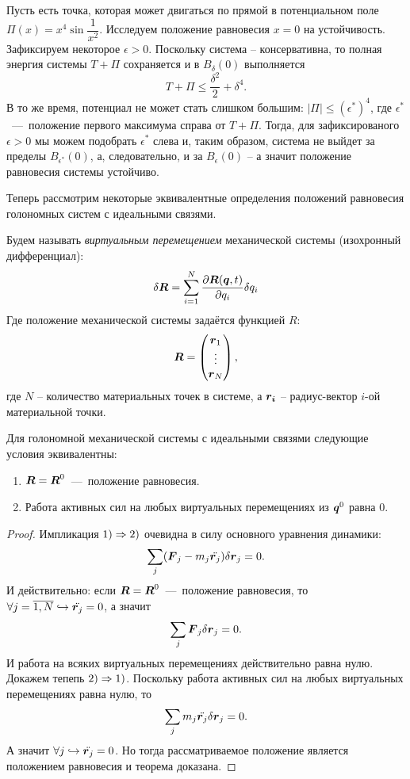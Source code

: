 \begin{example}
    Пусть есть точка, которая может двигаться по прямой в потенциальном поле $\Pi(x) = x^4\sin \dfrac{1}{x^2}$.
    Исследуем положение равновесия $x = 0$ на устойчивость. \\
    Зафиксируем некоторое $\epsilon > 0$.
    Поскольку система -- консервативна, то полная энергия системы $T + \Pi$ сохраняется и в $B_{\delta}(0)$ выполняется
    \[
        T + \Pi \leq \dfrac{\delta^2}{2} + \delta^4.
    \]
    В то же время, потенциал не может стать слишком большим: $|\Pi| \leq (\epsilon^*)^4$, где $\epsilon^*$~---~положение первого максимума справа от $T + \Pi$.
    Тогда, для зафиксированого $\epsilon > 0$ мы можем подобрать $\epsilon^*$ слева и, таким образом, система не выйдет за пределы $B_{\epsilon^*}(0)$, а, следовательно, и за $B_{\epsilon}(0)$ -- а значит положение равновесия системы устойчиво.
\end{example}
Теперь рассмотрим некоторые эквивалентные определения положений равновесия голономных систем с идеальными связями.
\begin{reminder}
 Будем называть \textit{виртуальным перемещением} механической системы (изохронный дифференциал):
\[
\delta \boldsymbol{R} = \sum_{i=1}^N \frac{\partial \boldsymbol{R}(\boldsymbol{q}, t)}{\partial q_i} \delta q_i
\]
Где положение механической системы задаётся функцией $R$:
\[
\boldsymbol{R} = \begin{pmatrix}
\boldsymbol{r}_1 \\
\vdots \\
\boldsymbol{r}_N
\end{pmatrix},
\]
где $N$ -- количество материальных точек в системе, а $\boldsymbol{r_i}$ -- радиус-вектор $i$-ой материальной точки.
\end{reminder}
\begin{theorem}
    Для голономной механической системы с идеальными связями следующие условия эквивалентны:
    \begin{enumerate}
        \item $\boldsymbol{R} = \boldsymbol{R}^0$~---~положение равновесия.
        \item Работа активных сил на любых виртуальных перемещениях из $\boldsymbol{q}^0$ равна 0.
    \end{enumerate}
\end{theorem}
\begin{proof}
    Импликация $1) \Rightarrow 2)$ очевидна в силу основного уравнения динамики:
    \[
        \sum\limits_j (\boldsymbol{F}_j - m_j \ddot{\boldsymbol{r}_j})\delta \boldsymbol{r}_j = 0.
    \]
    И действительно: если $\boldsymbol{R} = \boldsymbol{R}^0$~---~положение равновесия, то $\forall j = \overline{1, N} \hookrightarrow \ddot{\boldsymbol{r}_j} = 0$, а значит
    \[
        \sum\limits_j \boldsymbol{F}_j \delta \boldsymbol{r}_j = 0.
    \]
    И работа на всяких виртуальных перемещениях действительно равна нулю. \\
    Докажем тепепь $2) \Rightarrow 1)$.
    Поскольку работа активных сил на любых виртуальных перемещениях равна нулю, то
    \[
        \sum\limits_j m_j \ddot{\boldsymbol{r}_j} \delta \boldsymbol{r}_j = 0.
    \]
    А значит $\forall j \hookrightarrow  \ddot{\boldsymbol{r}_j} = 0$.
    Но тогда рассматриваемое положение является положением равновесия и теорема доказана.
\end{proof}

